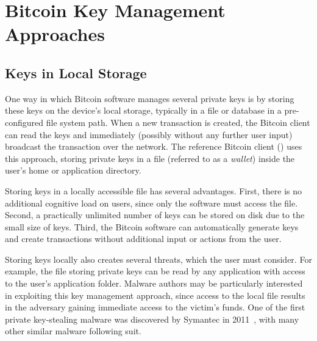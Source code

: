 
\section{Bitcoin Key Management Approaches} 


\subsection{Keys in Local Storage}
\label{sec:localstorage}
One way in which Bitcoin software manages several private keys is by storing these keys on the device's local storage, typically in a file or database in a pre-configured file system path. When a new transaction is created, the Bitcoin client can read the keys and immediately (possibly without any further user input) broadcast the transaction over the network. The reference Bitcoin client (\bitcoinclient) uses this approach, storing private keys in a file (referred to as a \emph{wallet}) inside the user's home or application directory. 

Storing keys in a locally accessible file has several advantages. First, there is no additional cognitive load on users, since only the software must access the file. Second, a practically unlimited number of keys can be stored on disk due to the small size of keys. Third, the Bitcoin software can automatically generate keys and create transactions without additional input or actions from the user. 

Storing keys locally also creates several threats, which the user must consider. For example, the file storing private keys can be read by any application with access to the user's application folder. Malware authors may be particularly interested in exploiting this key management approach, since access to the local file results in the adversary gaining immediate access to the victim's funds. One of the first private key-stealing malware was discovered by Symantec in 2011~\cite{coinbit}, with many other similar malware following suit.

